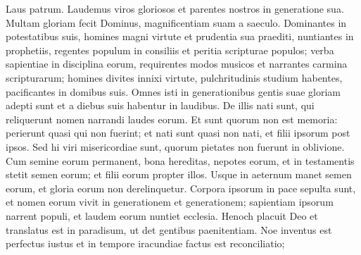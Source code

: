 \begin{biblechapter}
\begin{biblechapter}
\begin{biblechapter}
\begin{biblechapter}
\begin{biblechapter}
\begin{biblechapter}
\begin{biblechapter}
\begin{biblechapter}
\begin{biblechapter}
\begin{biblechapter}
\begin{biblechapter}
\begin{biblechapter}
\begin{biblechapter}
\begin{biblechapter}
\begin{biblechapter}
\begin{biblechapter}
\begin{biblechapter}
\begin{biblechapter}
\begin{biblechapter}
\begin{biblechapter}
\begin{biblechapter}
\begin{biblechapter}
\begin{biblechapter}
\begin{biblechapter}
\begin{biblechapter}
\begin{biblechapter}
\begin{biblechapter}
\begin{biblechapter}
\begin{biblechapter}
\begin{biblechapter}
\begin{biblechapter}
\begin{biblechapter}
\begin{biblechapter}
\begin{biblechapter}
\begin{biblechapter}
\begin{biblechapter}
\begin{biblechapter}
\begin{biblechapter}
\begin{biblechapter}
\begin{biblechapter}
\begin{biblechapter}
\begin{biblechapter}
\begin{biblechapter}
\begin{biblechapter}
 \verse Laus patrum.
 Laudemus viros gloriosos
 et parentes nostros in generatione sua.
 \verse Multam gloriam fecit Dominus,
 magnificentiam suam a saeculo.
 \verse Dominantes in potestatibus suis,
 homines magni virtute
 et prudentia sua praediti,
 nuntiantes in prophetiis,
 \verse regentes populum in consiliis
 et peritia scripturae populos;
 verba sapientiae in disciplina eorum,
 \verse requirentes modos musicos
 et narrantes carmina scripturarum;
 \verse homines divites innixi virtute,
 pulchritudinis studium habentes,
 pacificantes in domibus suis.
 \verse Omnes isti in generationibus gentis suae gloriam adepti sunt
 et a diebus suis habentur in laudibus.
 \verse De illis nati sunt, qui reliquerunt nomen
 narrandi laudes eorum.
 \verse Et sunt quorum non est memoria:
 perierunt quasi qui non fuerint;
 et nati sunt quasi non nati,
 et filii ipsorum post ipsos.
 \verse Sed hi viri misericordiae sunt,
 quorum pietates non fuerunt in oblivione.
 \verse Cum semine eorum permanent,
 bona hereditas, nepotes eorum,
 \verse et in testamentis stetit semen eorum;
 \verse et filii eorum propter illos.
 Usque in aeternum manet semen eorum,
 et gloria eorum non derelinquetur.
 \verse Corpora ipsorum in pace sepulta sunt,
 et nomen eorum vivit in generationem et generationem;
 \verse sapientiam ipsorum narrent populi,
 et laudem eorum nuntiet ecclesia.
 \verse Henoch placuit Deo et translatus est in paradisum,
 ut det gentibus paenitentiam.
 \verse Noe inventus est perfectus iustus
 et in tempore iracundiae factus est reconciliatio;

\end{biblechapter}
\end{biblechapter}
\end{biblechapter}
\end{biblechapter}
\end{biblechapter}
\end{biblechapter}
\end{biblechapter}
\end{biblechapter}
\end{biblechapter}
\end{biblechapter}
\end{biblechapter}
\end{biblechapter}
\end{biblechapter}
\end{biblechapter}
\end{biblechapter}
\end{biblechapter}
\end{biblechapter}
\end{biblechapter}
\end{biblechapter}
\end{biblechapter}
\end{biblechapter}
\end{biblechapter}
\end{biblechapter}
\end{biblechapter}
\end{biblechapter}
\end{biblechapter}
\end{biblechapter}
\end{biblechapter}
\end{biblechapter}
\end{biblechapter}
\end{biblechapter}
\end{biblechapter}
\end{biblechapter}
\end{biblechapter}
\end{biblechapter}
\end{biblechapter}
\end{biblechapter}
\end{biblechapter}
\end{biblechapter}
\end{biblechapter}
\end{biblechapter}
\end{biblechapter}
\end{biblechapter}
\end{biblechapter}
